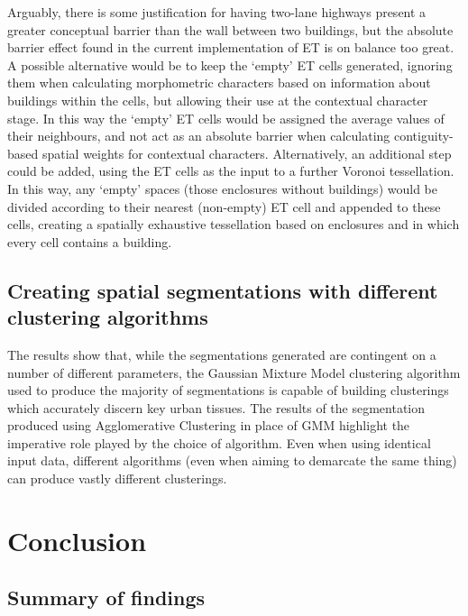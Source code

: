 \documentclass[a4paper, nobind]{templates/ociamthesis}
\begin{document}
Arguably, there is some justification for having two-lane highways present a greater conceptual barrier than the wall between two buildings, but the absolute barrier effect found in the current implementation of ET is on balance too great. A possible alternative would be to keep the `empty' ET cells generated, ignoring them when calculating morphometric characters based on information about buildings within the cells, but allowing their use at the contextual character stage. In this way the `empty' ET cells would be assigned the average values of their neighbours, and not act as an absolute barrier when calculating contiguity-based spatial weights for contextual characters. Alternatively, an additional step could be added, using the ET cells as the input to a further Voronoi tessellation. In this way, any `empty' spaces (those enclosures without buildings) would be divided according to their nearest (non-empty) ET cell and appended to these cells, creating a spatially exhaustive tessellation based on enclosures and in which every cell contains a building.

\hypertarget{creating-spatial-segmentations-with-different-clustering-algorithms}{%
\section{Creating spatial segmentations with different clustering algorithms}\label{creating-spatial-segmentations-with-different-clustering-algorithms}}

The results show that, while the segmentations generated are contingent on a number of different parameters, the Gaussian Mixture Model clustering algorithm used to produce the majority of segmentations is capable of building clusterings which accurately discern key urban tissues. The results of the segmentation produced using Agglomerative Clustering in place of GMM highlight the imperative role played by the choice of algorithm. Even when using identical input data, different algorithms (even when aiming to demarcate the same thing) can produce vastly different clusterings.

\hypertarget{conclusion}{%
\chapter{Conclusion}\label{conclusion}}

\minitoc 

\hypertarget{summary-of-findings}{%
\section{Summary of findings}\label{summary-of-findings}}
\end{document}
